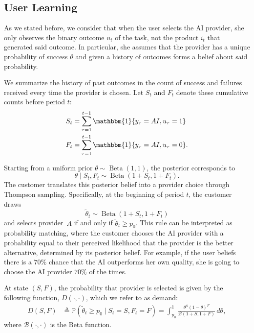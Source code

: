 \documentclass[11pt]{article}
\newcommand{\Pb}{\mathbb P}
\newcommand{\Ind}[1]{\mathbbm{1}\{#1\}}
\newcommand{\Bfun}{\mathcal{B}}
\begin{document}
\subsection{User Learning}

As we stated before, we consider that when the user selects the AI provider, she only observes the binary outcome $u_t$ of the task, not the product $i_t$ that generated said outcome. In particular, she assumes that the provider has a unique probability of success $\theta$ and given a history of outcomes forms a belief about said probability. 

We summarize the history of past outcomes in the count of success and failures received every time the provider is chosen. Let $S_t$ and $F_t$ denote these cumulative counts before period $t$:
\begin{align*}
    S_t &= \sum_{\tau=1}^{t-1}\Ind{y_\tau=AI,u_\tau=1}\\
    F_t &= \sum_{\tau=1}^{t-1}\Ind{y_\tau=AI,u_\tau=0}. 
\end{align*}

Starting from a uniform prior $\theta\sim\operatorname{Beta}(1,1)$, the posterior corresponds to 
\begin{equation*}
    \theta\mid S_t,F_t \sim \operatorname{Beta}(1+S_t,1+F_t).
\end{equation*}
The customer translates this posterior belief into a provider choice through Thompson sampling. Specifically, at the beginning of period $t$, the customer draws
\begin{equation*}
    \widetilde{\theta}_t \sim \operatorname{Beta}(1+S_t,1+F_t)
\end{equation*}
and selects provider~$A$ if and only if $\widetilde{\theta}_t\geq p_0$. This rule can be interpreted as probability matching, where the customer chooses the AI provider with a probability equal to their perceived likelihood that the provider is the better alternative, determined by its posterior belief. For example, if the user beliefs there is a $70\%$ chance that the AI outperforms her own quality, she is going to choose the AI provider $70\%$ of the times. 


At state $(S,F)$, the probability that provider is selected is given by the following function, $D(\cdot,\cdot)$, which we refer to as demand:
\begin{equation}
\begin{aligned}
    D(S,F)
    &\triangleq
    \Pb(\widetilde{\theta}_t\geq p_0\mid S_t=S,F_t=F) =
    \int_{p_0}^{1}
    \frac{\theta^S(1-\theta)^F}{\Bfun(1+S,1+F)}\,d\theta,
\end{aligned}
\label{eq:demand-probability}
\end{equation}
where $\Bfun(\cdot,\cdot)$ is the Beta function.
\end{document}
